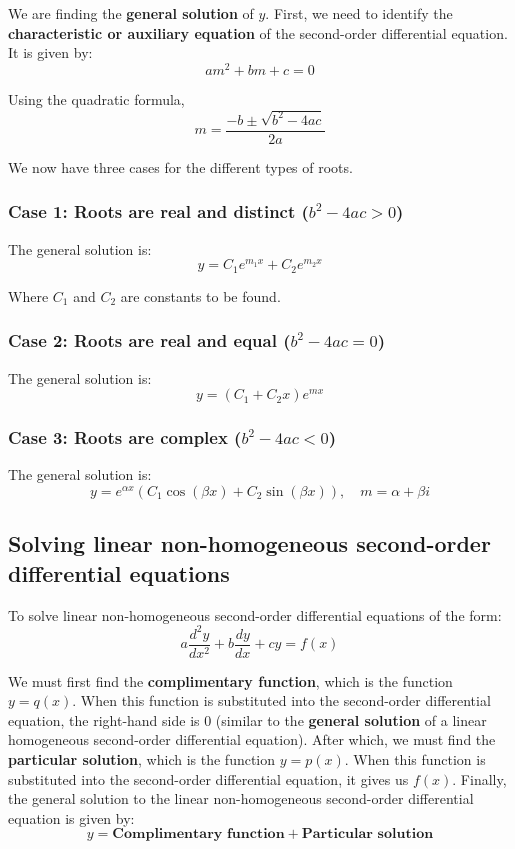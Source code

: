 \documentclass[11pt]{article}
\begin{document}
We are finding the \textbf{general solution} of \(y\). First, we need to identify the \textbf{characteristic or auxiliary equation} of the second-order differential equation. It is given by:
\[am^2 + bm + c = 0\]

Using the quadratic formula,
\[m = \frac{-b \pm \sqrt{b^2 - 4ac}}{2a}\]

We now have three cases for the different types of roots.
\subsubsection{Case 1: Roots are real and distinct (\(b^2 - 4ac > 0\))}
\label{sec:orge4a3f2a}
The general solution is:
\[y = C_1 e^{m_1 x} + C_2 e^{m_2 x}\]

Where \(C_1\) and \(C_2\) are constants to be found.
\subsubsection{Case 2: Roots are real and equal (\(b^2 - 4ac = 0\))}
\label{sec:org6d5d8da}
The general solution is:
\[y = (C_1 + C_2 x) e^{mx}\]
\subsubsection{Case 3: Roots are complex (\(b^2 - 4ac < 0\))}
\label{sec:orga6890e9}
The general solution is:
\[y = e^{\alpha x} (C_1 \cos (\beta x) + C_2 \sin (\beta x)), \quad m = \alpha + \beta i\]
\subsection{Solving linear non-homogeneous second-order differential equations}
\label{sec:org9dad825}
To solve linear non-homogeneous second-order differential equations of the form:
\[a \frac{d^2y}{dx^2} + b \frac{dy}{dx} + cy = f(x)\]

We must first find the \textbf{complimentary function}, which is the function \(y = q(x)\). When this function is substituted into the second-order differential equation, the right-hand side is 0 (similar to the \textbf{general solution} of a linear homogeneous second-order differential equation). After which, we must find the \textbf{particular solution}, which is the function \(y = p(x)\). When this function is substituted into the second-order differential equation, it gives us \(f(x)\). Finally, the general solution to the linear non-homogeneous second-order differential equation is given by:
\[y = \textbf{Complimentary function} + \textbf{Particular solution}\]
\end{document}
